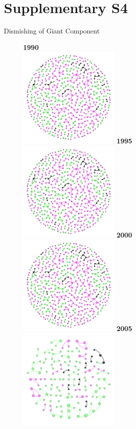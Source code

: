 \documentclass[10pt]{article}         %
\begin{document}
\newpage
\section{Supplementary S4}
Dismishing of Giant Component\\
\begin{figure}[!htb]
    \textbf{1990}\\
    \includegraphics[width=5cm, height=5cm]{S41990.png}
  \endminipage\hfill
    \textbf{1995}\\
    \includegraphics[width=5cm, height=5cm]{S41995.png}
  \endminipage\hfill
    \textbf{2000}\\
    \includegraphics[width=5cm, height=5cm]{S42000.png}
  \endminipage\hfill
    \textbf{2005}\\
    \includegraphics[width=5cm, height=5cm]{S42005.png}

\end{figure}
\end{document}
